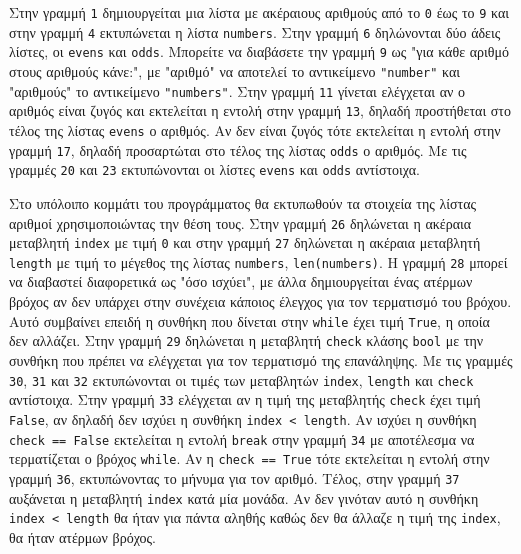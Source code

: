 \documentclass[14pt]{extreport}
\begin{document}
Στην γραμμή \lstinline{1} δημιουργείται μια λίστα με ακέραιους αριθμούς από το \lstinline{0} έως το \lstinline{9} και στην γραμμή \lstinline{4} εκτυπώνεται η λίστα \lstinline{numbers}. Στην γραμμή \lstinline{6} δηλώνονται δύο άδεις λίστες, οι \lstinline{evens} και \lstinline{odds}. Μπορείτε να διαβάσετε την γραμμή \lstinline{9} ως "για κάθε αριθμό στους αριθμούς κάνε:", με "αριθμό" να αποτελεί το αντικείμενο \lstinline{"number"} και "αριθμούς" το αντικείμενο \lstinline{"numbers"}. Στην γραμμή \lstinline{11} γίνεται ελέγχεται αν ο αριθμός είναι ζυγός και εκτελείται η εντολή στην γραμμή \lstinline{13}, δηλαδή προστήθεται στο τέλος της λίστας \lstinline{evens} ο αριθμός. Αν δεν είναι ζυγός τότε εκτελείται η εντολή στην γραμμή \lstinline{17}, δηλαδή προσαρτώται στο τέλος της λίστας \lstinline{odds} ο αριθμός. Με τις γραμμές \lstinline{20} και \lstinline{23} εκτυπώνονται οι λίστες \lstinline{evens} και \lstinline{odds} αντίστοιχα.

Στο υπόλοιπο κομμάτι του προγράμματος θα εκτυπωθούν τα στοιχεία της λίστας αριθμοί χρησιμοποιώντας την θέση τους. Στην γραμμή \lstinline{26} δηλώνεται η ακέραια μεταβλητή \lstinline{index} με τιμή \lstinline{0} και στην γραμμή \lstinline{27} δηλώνεται η ακέραια μεταβλητή \lstinline{length} με τιμή το μέγεθος της λίστας \lstinline{numbers}, \lstinline{len(numbers)}. Η γραμμή \lstinline{28} μπορεί να διαβαστεί διαφορετικά ως "όσο ισχύει", με άλλα δημιουργείται ένας ατέρμων βρόχος αν δεν υπάρχει στην συνέχεια κάποιος έλεγχος για τον τερματισμό του βρόχου. Αυτό συμβαίνει επειδή η συνθήκη που δίνεται στην \lstinline{while} έχει τιμή \lstinline{True}, η οποία δεν αλλάζει. Στην γραμμή \lstinline{29} δηλώνεται η μεταβλητή \lstinline{check} κλάσης \lstinline{bool} με την συνθήκη που πρέπει να ελέγχεται για τον τερματισμό της επανάληψης. Με τις γραμμές \lstinline{30}, \lstinline{31} και \lstinline{32} εκτυπώνονται οι τιμές των μεταβλητών \lstinline{index}, \lstinline{length} και \lstinline{check} αντίστοιχα. Στην γραμμή \lstinline{33} ελέγχεται αν η τιμή της μεταβλητής \lstinline{check} έχει τιμή \lstinline{False}, αν δηλαδή δεν ισχύει η συνθήκη \lstinline{index < length}. Αν ισχύει η συνθήκη \lstinline{check == False} εκτελείται η εντολή \lstinline{break} στην γραμμή \lstinline{34} με αποτέλεσμα να τερματίζεται ο βρόχος \lstinline{while}. Αν η \lstinline{check == True} τότε εκτελείται η εντολή στην γραμμή \lstinline{36}, εκτυπώνοντας το μήνυμα για τον αριθμό. Τέλος, στην γραμμή \lstinline{37} αυξάνεται η μεταβλητή \lstinline{index} κατά μία μονάδα. Aν δεν γινόταν αυτό η συνθήκη \lstinline{index < length} θα ήταν για πάντα αληθής καθώς δεν θα άλλαζε η τιμή της \lstinline{index}, θα ήταν ατέρμων βρόχος.
\end{document}
